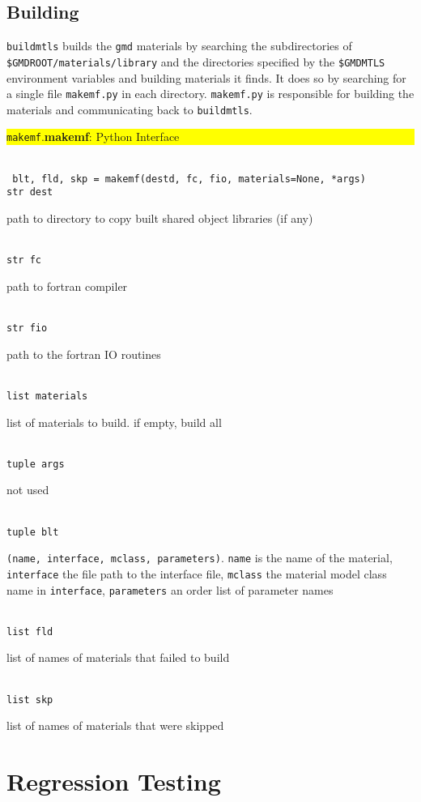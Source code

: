 \documentclass[11pt]{report}
\newcommand{\gmd}{\texttt{gmd}}
\newcommand{\bldm}{\texttt{buildmtls}}
\newcommand{\ttnoindent}[1]{\noindent\texttt{#1}}
\newcommand{\api}[2]{\noindent\colorbox{yellow}{%
    \begin{minipage}{\textwidth}%
      #1%
    \end{minipage}}\\[9pt]%
  \indent\texttt{#2}}
\newcommand{\param}[2]{\ttnoindent{#1}\\%
  \indent\begin{minipage}{.9\textwidth}#2\end{minipage}}
\begin{document}
\section{Building}
\label{sec:usrbld}
\bldm{} builds the \gmd{} materials by searching the subdirectories of\\
\texttt{\$GMDROOT/materials/library} and the directories specified by the
\verb|$GMDMTLS| environment variables and building materials it finds.  It
does so by searching for a single file \texttt{makemf.py} in each directory.
\texttt{makemf.py} is responsible for building the materials and communicating
back to \bldm{}.\\[4pt]

\api{\texttt{makemf}.\textbf{makemf}: Python Interface}{%
  blt, fld, skp = makemf(destd, fc, fio, materials=None, *args)}\\[8pt]
\param{str dest}{path to directory to copy built shared object libraries (if
  any)}\\
\param{str fc}{path to fortran compiler}\\
\param{str fio}{path to the fortran IO routines}\\
\param{list materials}{list of materials to build.  if empty, build all}\\
\param{tuple args}{not used}\\[9pt]
\param{tuple blt}{\texttt{(name, interface, mclass, parameters)}.
  \texttt{name} is the name of the material, \texttt{interface} the file path
  to the interface file, \texttt{mclass} the material model class name in
  \texttt{interface}, \texttt{parameters} an order list of parameter names}\\
\param{list fld}{list of names of materials that failed to build}\\
\param{list skp}{list of names of materials that were skipped}


\chapter{Regression Testing}
\end{document}
